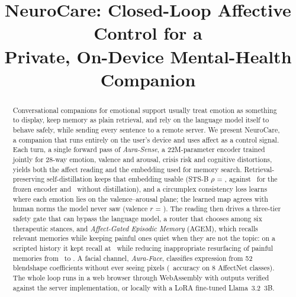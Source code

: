 \documentclass[conference]{IEEEtran}
\begin{document}
\title{NeuroCare: Closed-Loop Affective Control for a\\ Private, On-Device Mental-Health Companion}

\author{
\and
{}
}

\maketitle

\begin{abstract}
Conversational companions for emotional support usually treat emotion as something to display, keep memory as plain retrieval, and rely on the language model itself to behave safely, while sending every sentence to a remote server. We present NeuroCare, a companion that runs entirely on the user's device and uses affect as a control signal. Each turn, a single forward pass of \emph{Aura-Sense}, a 22M-parameter encoder trained jointly for 28-way emotion, valence and arousal, crisis risk and cognitive distortions, yields both the affect reading and the embedding used for memory search. Retrieval-preserving self-distillation keeps that embedding usable (STS-B $\rho$ = \STS, against \STSteacher\ for the frozen encoder and \STSmt\ without distillation), and a circumplex consistency loss learns where each emotion lies on the valence--arousal plane; the learned map agrees with human norms the model never saw (valence $r$ = \NRCv). The reading then drives a three-tier safety gate that can bypass the language model, a router that chooses among six therapeutic stances, and \emph{Affect-Gated Episodic Memory} (AGEM), which recalls relevant memories while keeping painful ones quiet when they are not the topic: on a scripted history it kept recall at \AgemRecall\ while reducing inappropriate resurfacing of painful memories from \PlainISR\ to \AgemISR. A facial channel, \emph{Aura-Face}, classifies expression from 52 blendshape coefficients without ever seeing pixels (\FaceAcc\ accuracy on 8 AffectNet classes). The whole loop runs in a web browser through WebAssembly with outputs verified against the server implementation, or locally with a LoRA fine-tuned Llama~3.2~3B.
\end{abstract}
\end{document}
